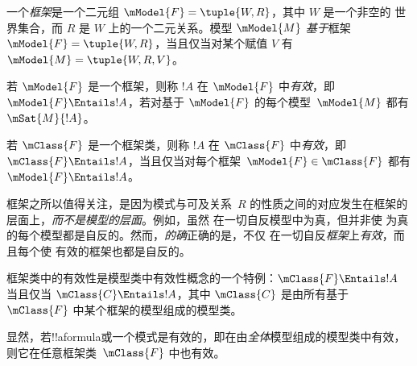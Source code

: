 \documentclass[../../../include/open-logic-section]{subfiles}
\begin{document}


\begin{defn}
  一个\emph{框架}是一个二元组 $\mModel{F} = \tuple{W,R}$，其中 $W$ 是一个非空的
  世界集合，而 $R$ 是 $W$ 上的一个二元关系。模型
  $\mModel{M}$ \emph{基于}框架 $\mModel{F} = \tuple{W,R}$，当且仅当对某个赋值 $V$ 有 $\mModel{M} = \tuple{W, R, V}$。
\end{defn}

\begin{defn}
  若 $\mModel{F}$ 是一个框架，则称 $!A$ 在 $\mModel{F}$ 中\emph{有效}，即
  $\mModel{F} \Entails !A$，若对基于 $\mModel{F}$ 的每个模型~$\mModel{M}$ 都有 $\mSat{M}{!A}$。

  若 $\mClass{F}$ 是一个框架类，则称 $!A$ 在 $\mClass{F}$ 中\emph{有效}，即
  $\mClass{F} \Entails !A$，当且仅当对每个框架~$\mModel{F} \in \mClass{F}$ 都有 $\mModel{F} \Entails !A$。
\end{defn}

框架之所以值得关注，是因为模式与可及关系~$R$ 的性质之间的对应发生在框架的层面上，\emph{而不是模型的层面}。例如，虽然  在一切自反模型中为真，但并非使  为真的每个模型都是自反的。然而，\emph{的确}正确的是，不仅  在一切自反\emph{框架}上\emph{有效}，而且每个使  有效的框架也都是自反的。

\begin{rem}
框架类中的有效性是模型类中有效性概念的一个特例：$\mClass{F} \Entails !A$ 当且仅当 $\mClass{C} \Entails !A$，其中 $\mClass{C}$ 是由所有基于~$\mClass{F}$ 中某个框架的模型组成的模型类。

显然，若!!a{formula}或一个模式是有效的，即在由\emph{全体}模型组成的模型类中有效，则它在任意框架类~$\mClass{F}$ 中也有效。
\end{rem}
\end{document}
